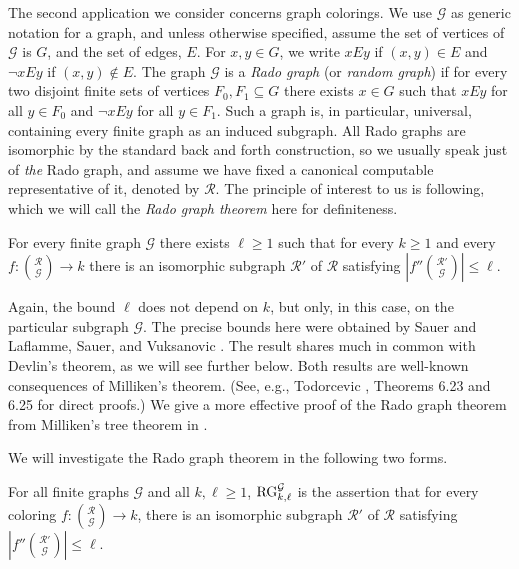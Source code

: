 The second application we consider concerns graph colorings. We use $\mathcal{G}$ as generic notation for a graph, and unless otherwise specified, assume the set of vertices of $\mathcal{G}$ is $G$, and the set of edges, $E$. For $x,y \in G$, we write $xEy$ if $(x,y) \in E$ and $\lnot x E y$ if $(x,y) \notin E$. The graph $\mathcal{G}$ is a \emph{Rado graph} (or \emph{random graph})    if for every two disjoint finite sets of vertices $F_0,F_1 \subseteq G$ there exists $x \in G$ such that $xEy$ for all $y \in F_0$ and $\lnot x E y$ for all $y \in F_1$. Such a graph is, in particular, universal, containing every finite graph as an induced subgraph. All Rado graphs are isomorphic by the standard back and forth construction, so we usually speak just of \emph{the} Rado graph, and assume we have fixed a canonical computable representative of it, denoted by $\mathcal{R}$. The principle of interest to us is following, which we will call the \emph{Rado graph theorem} here for definiteness.
\begin{theorem}
	For every finite graph $\mathcal{G}$ there exists $\ell \geq 1$ such that for every $k \geq 1$ and every $f: {\mathcal{R} \choose \mathcal{G}} \to k$ there is an isomorphic subgraph $\mathcal{R}'$ of $\mathcal{R}$ satisfying $|f'' {\mathcal{R}' \choose \mathcal{G}}| \leq \ell$.
\end{theorem}

Again, the bound $\ell$ does not depend on $k$, but only, in this case, on the particular subgraph $\mathcal{G}$. The precise bounds here were obtained by Sauer \cite{Sauer2006} and Laflamme, Sauer, and Vuksanovic \cite{LSV2006}. The result shares much in common with Devlin's theorem, as we will see further below. Both results are well-known consequences of Milliken's theorem. (See, e.g., Todorcevic \cite{Todorcevic2010Ramsey}, Theorems 6.23 and 6.25 for direct proofs.) We give a more effective proof of the Rado graph theorem from Milliken's tree theorem in .

We will investigate the Rado graph theorem in the following two forms.

\begin{statement}
For all finite graphs $\mathcal{G}$ and all $k,\ell \geq 1$, $\mathrm{RG}^\mathcal{G}_{k,\ell}$ is the assertion that for every coloring $f: {\mathcal{R} \choose \mathcal{G}} \to k$, there is an isomorphic subgraph $\mathcal{R}'$ of $\mathcal{R}$ satisfying $|f''{\mathcal{R}' \choose \mathcal{G}}| \leq \ell$.
\end{statement}

